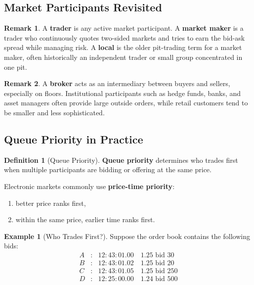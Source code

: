 \documentclass[11pt]{article}
\theoremstyle{definition}
\newtheorem{definition}{Definition}[section]
\newtheorem{example}{Example}[section]
\newtheorem{remark}{Remark}[section]
\begin{document}
\subsection{Market Participants Revisited}

\begin{remark}
A \textbf{trader} is any active market participant. A \textbf{market maker} is a trader who continuously quotes two-sided markets and tries to earn the bid-ask spread while managing risk. A \textbf{local} is the older pit-trading term for a market maker, often historically an independent trader or small group concentrated in one pit.
\end{remark}

\begin{remark}
A \textbf{broker} acts as an intermediary between buyers and sellers, especially on floors. Institutional participants such as hedge funds, banks, and asset managers often provide large outside orders, while retail customers tend to be smaller and less sophisticated.
\end{remark}

\subsection{Queue Priority in Practice}

\begin{definition}[Queue Priority]
\textbf{Queue priority} determines who trades first when multiple participants are bidding or offering at the same price.
\end{definition}

Electronic markets commonly use \textbf{price-time priority}:
\begin{enumerate}[leftmargin=2em]
    \item better price ranks first,
    \item within the same price, earlier time ranks first.
\end{enumerate}

\begin{example}[Who Trades First?]
Suppose the order book contains the following bids:
\[
\begin{array}{ccl}
A & : & 12{:}43{:}01.00 \quad 1.25 \text{ bid } 30 \\
B & : & 12{:}43{:}01.02 \quad 1.25 \text{ bid } 20 \\
C & : & 12{:}43{:}01.05 \quad 1.25 \text{ bid } 250 \\
D & : & 12{:}25{:}00.00 \quad 1.24 \text{ bid } 500
\end{array}
\]
\end{example}
\end{document}
